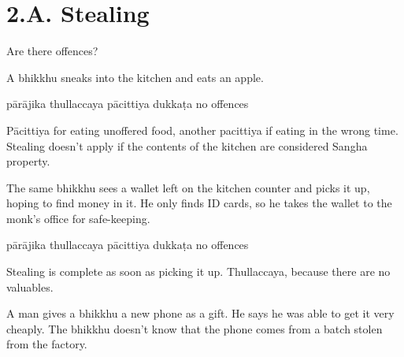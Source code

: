 \chapter{2.A. Stealing}
\renewcommand*{\theChapterTitle}{2.A. Stealing}

\begin{exam}{\autoExamName}

\begin{problem*}

  Are there offences?

\begin{parts}

  \item A bhikkhu sneaks into the kitchen and eats an apple.

  \bigskip

  \begin{answers}{5}
    \bChoices
     pārājika\eAns
     thullaccaya\eAns
     pācittiya\eAns
     dukkaṭa\eAns
     no offences\eAns
    \eChoices
  \end{answers}

  \bigskip

  \begin{solution}
    Pācittiya for eating unoffered food, another pacittiya if eating in the
    wrong time. Stealing doesn't apply if the contents of the kitchen are
    considered Sangha property.
  \end{solution}

  \item The same bhikkhu sees a wallet left on the kitchen counter and picks it
    up, hoping to find money in it. He only finds ID cards, so he takes the wallet
    to the monk's office for safe-keeping.

  \bigskip

  \begin{answers}{5}
    \bChoices
     pārājika\eAns
     thullaccaya\eAns
     pācittiya\eAns
     dukkaṭa\eAns
     no offences\eAns
    \eChoices
  \end{answers}

  \begin{solution}
    Stealing is complete as soon as picking it up. Thullaccaya, because there are
    no valuables.
  \end{solution}

  \bigskip

  \item A man gives a bhikkhu a new phone as a gift. He says he was able to get it very cheaply.
  The bhikkhu doesn't know that the phone comes from a batch stolen from the factory. 


\end{parts}
\end{problem*}
\end{exam}
